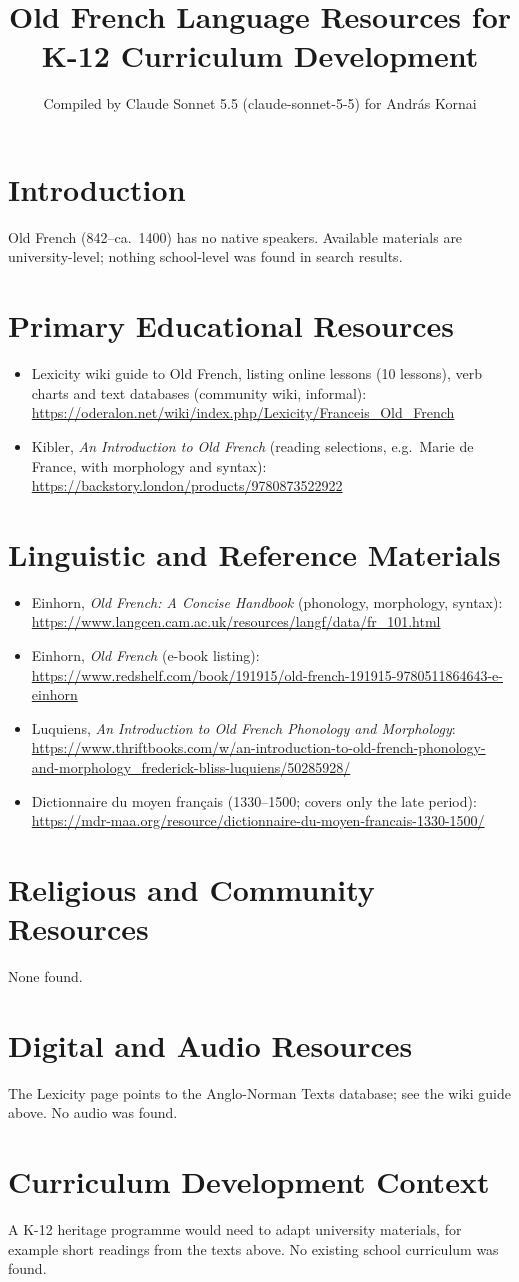 \documentclass[12pt]{article}
\title{Old French Language Resources for K-12 Curriculum Development}
\author{Compiled by Claude Sonnet 5.5 (claude-sonnet-5-5) for Andr\'as Kornai}
\date{}
\begin{document}
\maketitle
\section{Introduction}
Old French (842--ca.\ 1400) has no native speakers. Available materials are university-level; nothing school-level was found in search results.
\section{Primary Educational Resources}
\begin{itemize}
\item Lexicity wiki guide to Old French, listing online lessons (10 lessons), verb charts and text databases (community wiki, informal): \url{https://oderalon.net/wiki/index.php/Lexicity/Franceis_Old_French}
\item Kibler, \emph{An Introduction to Old French} (reading selections, e.g.\ Marie de France, with morphology and syntax): \url{https://backstory.london/products/9780873522922}
\end{itemize}
\section{Linguistic and Reference Materials}
\begin{itemize}
\item Einhorn, \emph{Old French: A Concise Handbook} (phonology, morphology, syntax): \url{https://www.langcen.cam.ac.uk/resources/langf/data/fr_101.html}
\item Einhorn, \emph{Old French} (e-book listing): \url{https://www.redshelf.com/book/191915/old-french-191915-9780511864643-e-einhorn}
\item Luquiens, \emph{An Introduction to Old French Phonology and Morphology}: \url{https://www.thriftbooks.com/w/an-introduction-to-old-french-phonology-and-morphology_frederick-bliss-luquiens/50285928/}
\item Dictionnaire du moyen fran\c{c}ais (1330--1500; covers only the late period): \url{https://mdr-maa.org/resource/dictionnaire-du-moyen-francais-1330-1500/}
\end{itemize}
\section{Religious and Community Resources}
None found.
\section{Digital and Audio Resources}
The Lexicity page points to the Anglo-Norman Texts database; see the wiki guide above. No audio was found.
\section{Curriculum Development Context}
A K-12 heritage programme would need to adapt university materials, for example short readings from the texts above. No existing school curriculum was found.
\end{document}
